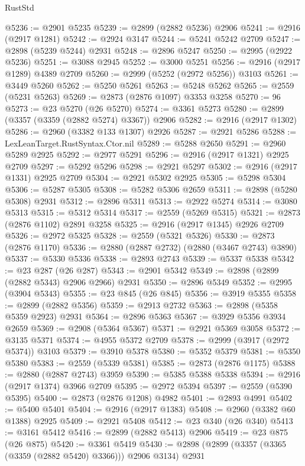 \begin{lexlean}{RustStd}
\begin{coremodule}
@5236 := @2901 @5235
@5239 := @2899 (@2882 @5236) @2906
@5241 := @2916 (@2917 @1281)
@5242 := @2924 @3147
@5244 := @5241 @5242 @2709
@5247 := @2898 (@5239 @5244) @2931
@5248 := @2896 @5247
@5250 := @2995 (@2922 @5236)
@5251 := @3088 @2945
@5252 := @3000 @5251
@5256 := @2916 (@2917 @1289) @4389 @2709
@5260 := @2999 (@5252 (@2972 @5256)) @3103
@5261 := @3449 @5260
@5262 := @5250 @5261
@5263 := @5248 @5262
@5265 := @2559 (@5231 @5263)
@5269 := @2873 (@2876 @1097) @3353 @3258
@5270 := 96
@5273 := @23 @5270 (@26 @5270)
@5274 := @3361 @5273
@5280 := @2899 (@3357 (@3359 (@2882 @5274) @3367)) @2906
@5282 := @2916 (@2917 @1302)
@5286 := @2960 (@3382 @133 @1307) @2926
@5287 := @2921 @5286
@5288 := LexLeanTarget.RustSyntax.Ctor.nil
@5289 := @5288 @2650
@5291 := @2960 @5289 @2925
@5292 := @2977 @5291
@5296 := @2916 (@2917 @1321) @2925 @2709
@5297 := @5292 @5296
@5298 := @2921 @5297
@5302 := @2916 (@2917 @1331) @2925 @2709
@5304 := @2921 @5302 @2925
@5305 := @5298 @5304
@5306 := @5287 @5305
@5308 := @5282 @5306 @2659
@5311 := @2898 (@5280 @5308) @2931
@5312 := @2896 @5311
@5313 := @2922 @5274
@5314 := @3080 @5313
@5315 := @5312 @5314
@5317 := @2559 (@5269 @5315)
@5321 := @2873 (@2876 @1102) @2891 @3258
@5325 := @2916 (@2917 @1345) @2926 @2709
@5326 := @2972 @5325
@5328 := @2559 (@5321 @5326)
@5330 := @2873 (@2876 @1170)
@5336 := @2880 (@2887 @2732) (@2880 (@3467 @2743) @3890)
@5337 := @5330 @5336
@5338 := @2893 @2743
@5339 := @5337 @5338
@5342 := @23 @287 (@26 @287)
@5343 := @2901 @5342
@5349 := @2898 (@2899 (@2882 @5343) @2906 @2966) @2931
@5350 := @2896 @5349
@5352 := @2995 (@3904 @5343)
@5355 := @23 @845 (@26 @845)
@5356 := @3919 @5355
@5358 := @2899 (@2882 @5356)
@5359 := @2913 @2732
@5363 := @2898 (@5358 @5359 @2923) @2931
@5364 := @2896 @5363
@5367 := @3929 @5356 @3934 @2659
@5369 := @2908 (@5364 @5367)
@5371 := @2921 @5369 @3058
@5372 := @3135 @5371
@5374 := @4955 @5372 @2709
@5378 := @2999 (@3917 (@2972 @5374)) @3103
@5379 := @3910 @5378
@5380 := @5352 @5379
@5381 := @5350 @5380
@5383 := @2559 (@5339 @5381)
@5385 := @2873 (@2876 @1175)
@5388 := @2880 (@2887 @2743) @3959
@5390 := @5385 @5388 @5338
@5394 := @2916 (@2917 @1374) @3966 @2709
@5395 := @2972 @5394
@5397 := @2559 (@5390 @5395)
@5400 := @2873 (@2876 @1208) @4982
@5401 := @2893 @4991
@5402 := @5400 @5401
@5404 := @2916 (@2917 @1383)
@5408 := @2960 (@3382 @60 @1388) @2925
@5409 := @2921 @5408
@5412 := @23 @340 (@26 @340)
@5413 := @3161 @5412
@5416 := @2899 (@2882 @5413) @2906
@5419 := @23 @875 (@26 @875)
@5420 := @3361 @5419
@5430 := @2898 (@2899 (@3357 (@3365 (@3359 (@2882 @5420) @3366))) @2906 @3134) @2931

\end{coremodule}
\end{lexlean}
